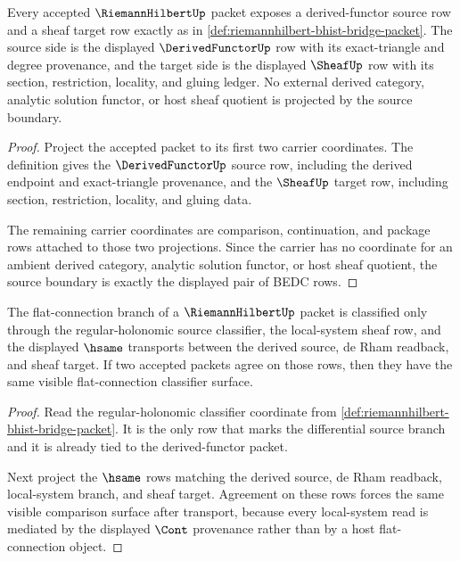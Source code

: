 \begin{theorem}
\label{thm:riemannhilbert-derived-sheaf-source}
Every accepted $\RiemannHilbertUp$ packet exposes a derived-functor source row and a sheaf target row exactly as in \autoref{def:riemannhilbert-bhist-bridge-packet}. The source side is the displayed $\DerivedFunctorUp$ row with its exact-triangle and degree provenance, and the target side is the displayed $\SheafUp$ row with its section, restriction, locality, and gluing ledger. No external derived category, analytic solution functor, or host sheaf quotient is projected by the source boundary.
\end{theorem}
\begin{proof}
Project the accepted packet to its first two carrier coordinates. The definition gives the $\DerivedFunctorUp$ source row, including the derived endpoint and exact-triangle provenance, and the $\SheafUp$ target row, including section, restriction, locality, and gluing data.

The remaining carrier coordinates are comparison, continuation, and package rows attached to those two projections. Since the carrier has no coordinate for an ambient derived category, analytic solution functor, or host sheaf quotient, the source boundary is exactly the displayed pair of BEDC rows.
\end{proof}

\begin{theorem}
\label{thm:riemannhilbert-flat-connection-classifier}
The flat-connection branch of a $\RiemannHilbertUp$ packet is classified only through the regular-holonomic source classifier, the local-system sheaf row, and the displayed $\hsame$ transports between the derived source, de Rham readback, and sheaf target. If two accepted packets agree on those rows, then they have the same visible flat-connection classifier surface.
\end{theorem}
\begin{proof}
Read the regular-holonomic classifier coordinate from \autoref{def:riemannhilbert-bhist-bridge-packet}. It is the only row that marks the differential source branch and it is already tied to the derived-functor packet.

Next project the $\hsame$ rows matching the derived source, de Rham readback, local-system branch, and sheaf target. Agreement on these rows forces the same visible comparison surface after transport, because every local-system read is mediated by the displayed $\Cont$ provenance rather than by a host flat-connection object.
\end{proof}

